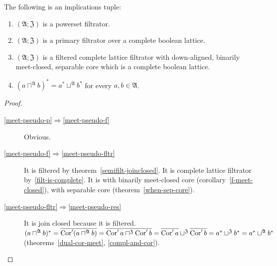 \begin{thm}
The following is an implications tuple:
\begin{enumerate}
\item \label{meet-pseudo-p}$(\mathfrak{A};\mathfrak{Z})$ is a powerset filtrator.
\item \label{meet-pseudo-f}$(\mathfrak{A};\mathfrak{Z})$ is a primary filtrator over a complete boolean lattice.
\item \label{meet-pseudo-fltr}$(\mathfrak{A};\mathfrak{Z})$ is a filtered
complete lattice filtrator with down-aligned, binarily meet-closed,
separable core which is a complete boolean lattice.
\item \label{meet-pseudo-res}$(a\sqcap^{\mathfrak{A}}b)^{\ast}=a^{\ast}\sqcup^{\mathfrak{A}}b^{\ast}$
for every $a,b\in\mathfrak{A}$.
\end{enumerate}
\end{thm}
\begin{proof}
~
\begin{description}
\item [\ref{meet-pseudo-p}$\Rightarrow$\ref{meet-pseudo-f}] Obvious.
\item [\ref{meet-pseudo-f}$\Rightarrow$\ref{meet-pseudo-fltr}]
It is filtered by theorem~\ref{semifilt-joinclosed}. It is complete lattice filtrator by~\ref{filt-is-complete}.
It is with binarily meet-closed core (corollary~\ref{f-meet-closed}),
with separable core (theorem~\ref{when-sep-core}).
\item [\ref{meet-pseudo-fltr}$\Rightarrow$\ref{meet-pseudo-res}]
It is join closed because it is filtered.
$(a\sqcap^{\mathfrak{A}}b)^{\ast} = \overline{\operatorname{Cor}'(a\sqcap^{\mathfrak{A}}b)} =
\overline{\operatorname{Cor}'a\sqcap^{\mathfrak{Z}}\operatorname{Cor}'b} =
\overline{\operatorname{Cor}'a}\sqcup^{\mathfrak{Z}}\overline{\operatorname{Cor}'b} =
a^{\ast}\sqcup^{\mathfrak{Z}}b^{\ast} = a^{\ast}\sqcup^{\mathfrak{A}}b^{\ast}$
(theorems~\ref{dual-cor-meet}, \ref{compl-and-cor}).
\end{description}
\end{proof}

